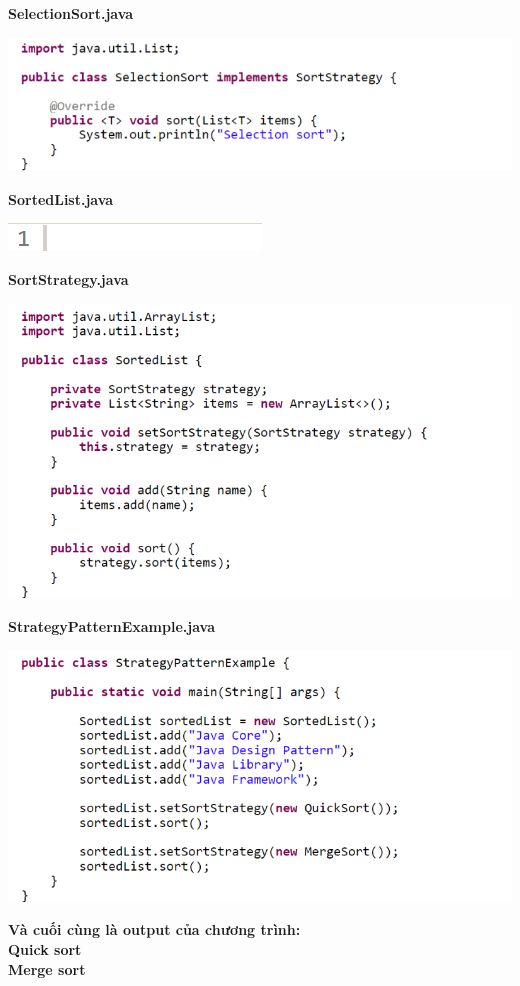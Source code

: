 \textbf{SelectionSort.java}
\begin{center}
\includegraphics{GALLEYS/images/chapter9/code4}
\end{center}
\textbf{SortedList.java}
\begin{center}
\includegraphics{GALLEYS/images/chapter9/code5}
\end{center}
\newpage
\textbf{SortStrategy.java}
\begin{center}
\includegraphics{GALLEYS/images/chapter9/code6}
\end{center}
\newpage
\textbf{StrategyPatternExample.java}
\begin{center}
\includegraphics{GALLEYS/images/chapter9/code7}
\end{center}
\textbf{Và cuối cùng là output của chương trình:}\\
\textbf{Quick sort}\\
\textbf{Merge sort}

